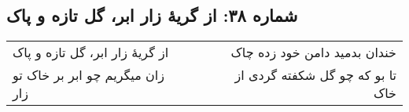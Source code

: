 \begin{center}
\section*{شماره ۳۸: از گریۀ زار ابر، گل تازه و پاک}
\label{sec:038}
\begin{longtable}{l p{0.5cm} r}
از گریهٔ زار ابر، گل تازه و پاک
&&
خندان بدمید دامن خود زده چاک
\\
زان میگریم چو ابر بر خاک تو زار
&&
تا بو که چو گل شکفته گردی از خاک
\\
\end{longtable}
\end{center}
